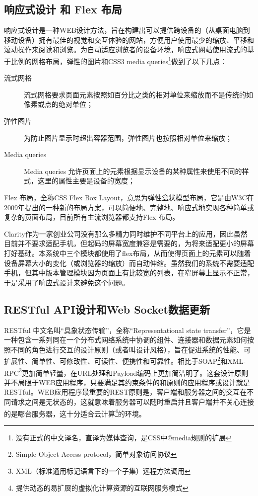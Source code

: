 \subsection{响应式设计 和 Flex 布局}
响应式设计是一种WEB设计方法，旨在构建出可以提供跨设备的（从桌面电脑到移动设备）拥有最佳的视觉和交互体验的网站，方便用户使用最少的缩放、平移和滚动操作来阅读和浏览。\supercite{marcotte2013responsive}为自动适应浏览者的设备环境，响应式网站使用流式的基于比例的网格布局，弹性的图片和CSS3 media queries\footnote{没有正式的中文译名，直译为媒体查询，是CSS中@media规则的扩展}做到了以下几点：
\begin{description}
  \item[流式网格] 流式网格要求页面元素按照如百分比之类的相对单位来缩放而不是传统的如像素或点的绝对单位；
  \item[弹性图片] 为防止图片显示时超出容器范围，弹性图片也按照相对单位来缩放；
  \item[Media queries] Media queries 允许页面上的元素根据显示设备的某种属性来使用不同的样式，这里的属性主要是设备的宽度；
\end{description}

Flex 布局，全称CSS Flex Box Layout，意思为弹性盒状模型布局，它是由W3C在2009年提出的一种新的布局方案，可以简便地、完整地、响应式地实现各种简单或复杂的页面布局，目前所有主流浏览器都支持Flex 布局。

Clarity作为一家创业公司没有那么多精力同时维护不同平台上的应用，因此虽然目前并不要求适配手机，但起码的屏幕宽度兼容是需要的，为将来适配更小的屏幕打好基础。本系统中三个模块都使用了flex布局，从而使得页面上的元素可以随着设备屏幕大小的变化（或浏览器的缩放）而自动伸缩。虽然我们的系统不需要适配手机，但其中版本管理模块因为页面上有比较宽的列表，在窄屏幕上显示不正常，于是采用了响应式设计来避免这个问题。
\subsection{RESTful API设计和Web Socket数据更新}
RESTful 中文名叫“具象状态传输”，全称“Representational state transfer”，它是一种包含一系列同在一个分布式网络系统中协调的组件、连接器和数据元素如何按照不同的角色进行交互的设计原则（或者叫设计风格），旨在促进系统的性能、可扩展性、简单性、可修改性、可读性、便携性和可靠性。\supercite{fielding2002principled,fielding2000architectural}相比于SOAP\footnote{Simple Object Access protocol，简单对象访问协议}和XML-RPC\footnote{XML（标准通用标记语言下的一个子集）远程方法调用}更加简单轻量，在URL处理和Payload编码上更加简洁明了。这套设计原则并不局限于WEB应用程序，只要满足其约束条件的和原则的应用程序或设计就是RESTful。WEB应用程序最重要的REST原则是，客户端和服务器之间的交互在不同请求之间是无状态的，这就意味着服务器可以随时重启并且客户端并不关心连接的是哪台服务器，这十分适合云计算\footnote{提供动态的易扩展的虚拟化计算资源的互联网服务模式}的环境。

